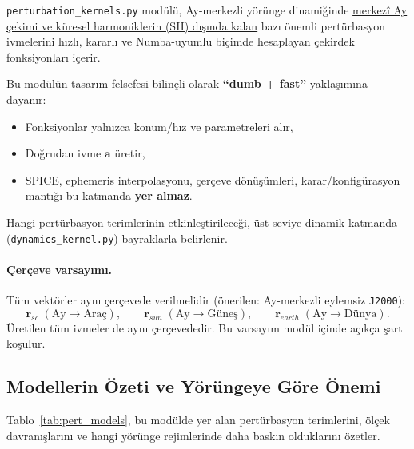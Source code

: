\texttt{perturbation\_kernels.py} modülü, Ay-merkezli yörünge dinamiğinde \uline{merkezî Ay çekimi ve küresel harmoniklerin (SH) dışında kalan} bazı önemli pertürbasyon ivmelerini
hızlı, kararlı ve Numba-uyumlu biçimde hesaplayan çekirdek fonksiyonları içerir.

Bu modülün tasarım felsefesi bilinçli olarak
\textbf{``dumb + fast''} yaklaşımına dayanır:
\begin{itemize}
  \item Fonksiyonlar yalnızca konum/hız ve parametreleri alır,
  \item Doğrudan ivme $\mathbf{a}$ üretir,
  \item SPICE, ephemeris interpolasyonu, çerçeve dönüşümleri,
        karar/konfigürasyon mantığı bu katmanda \textbf{yer almaz}.
\end{itemize}
Hangi pertürbasyon terimlerinin etkinleştirileceği,
üst seviye dinamik katmanda (\texttt{dynamics\_kernel.py}) bayraklarla belirlenir.

\paragraph{Çerçeve varsayımı.}
Tüm vektörler aynı çerçevede verilmelidir
(önerilen: Ay-merkezli eylemsiz \texttt{J2000}):
\[
\mathbf{r}_{sc}\;(\text{Ay}\rightarrow\text{Araç}),\qquad
\mathbf{r}_{sun}\;(\text{Ay}\rightarrow\text{Güneş}),\qquad
\mathbf{r}_{earth}\;(\text{Ay}\rightarrow\text{Dünya}).
\]
Üretilen tüm ivmeler de aynı çerçevededir.
Bu varsayım modül içinde açıkça şart koşulur.

\subsection*{Modellerin Özeti ve Yörüngeye Göre Önemi}

Tablo~\ref{tab:pert_models}, bu modülde yer alan pertürbasyon terimlerini,
ölçek davranışlarını ve hangi yörünge rejimlerinde daha baskın olduklarını özetler.

